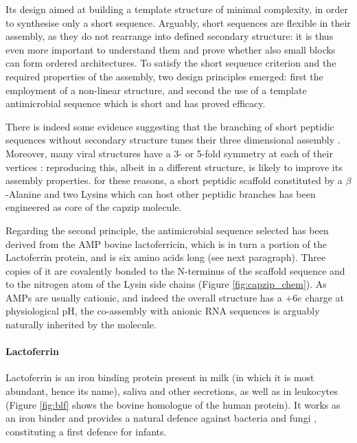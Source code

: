 Its design aimed at building a template structure of minimal complexity, in order to synthesise only a short sequence. Arguably, short sequences are flexible in their assembly, as they do not rearrange into defined secondary structure: it is thus even more important to understand them and prove whether also small blocks can form ordered architectures.
%
To satisfy the short sequence criterion and the required properties of the assembly, two design principles emerged: first the employment of a non-linear structure, and second the use of a template antimicrobial sequence which is short and has proved efficacy.

There is indeed some evidence suggesting that the branching of short peptidic sequences without secondary structure tunes their three dimensional assembly \citep{Gudlur2012,Breger2017,Zhao2018branch}. Moreover, many viral structures have a 3- or 5-fold symmetry at each of their vertices \citep{Schoonen2014}: reproducing this, albeit in a different structure, is likely to improve its assembly properties.
%
for these reasons, a short peptidic scaffold constituted by a $\beta$-Alanine and two Lysins which can host other peptidic branches has been engineered as core of the capzip molecule.

Regarding the second principle, the antimicrobial sequence selected has been derived from the AMP bovine lactoferricin, which is in turn a portion of the Lactoferrin protein, and is six amino acids long (see next paragraph).
%
Three copies of it are covalently bonded to the N-terminus of the scaffold sequence and to the nitrogen atom of the Lysin side chains (Figure \ref{fig:capzip_chem}).
%
As AMPs are usually cationic, and indeed the overall structure has a $+6e$ charge at physiological pH, the co-assembly with anionic RNA sequences is arguably naturally inherited by the molecule.


\paragraph{Lactoferrin} Lactoferrin is an iron binding protein present in milk (in which it is most abundant, hence its name), saliva and other secretions, as well as in leukocytes (Figure \ref{fig:blf} shows the bovine homologue of the human protein).
%
It works as an iron binder and provides a natural defence against bacteria and fungi \citep{Sanchez1992,Arnold1977,Arnold1980,Kirkpatrick1971,Jahani2015}, constituting a first defence for infants.

